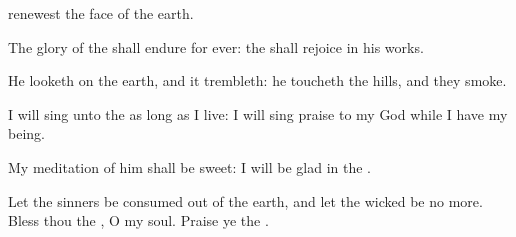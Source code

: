 {renewest the
face of the
earth.
\par }{\BB \par }{\Q {}The
glory of the
{} shall endure for
ever: the
{} shall
rejoice in his
works.
\par }{\Q {}He
looketh on the
earth, and it
trembleth: he
toucheth the
hills, and they
smoke.
\par }{\Q {}I will
sing unto the
{} as long as I
live: I will
sing praise to my
God while I have my
being.
\par }{\Q {}My
meditation of him shall be
sweet: I will be
glad in the
{}.
\par }{\Q {}Let the
sinners be
consumed out of the
earth, and let the
wicked be no more.
Bless thou the
{}, O my
soul.
Praise ye the
{}.

}
